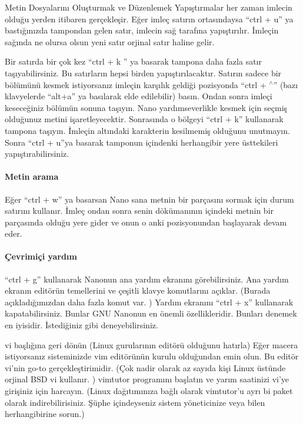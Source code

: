 \documentclass[10pt,a5paper]{book}
\begin{document}
\begin{section}{Metin Dosyalarını Oluşturmak ve Düzenlemek}
Yapıştırmalar her zaman imlecin olduğu yerden itibaren gerçekleşir. Eğer imleç satırın ortasındaysa “ctrl + u” ya bastığınızda tampondan gelen satır, imlecin sağ tarafına yapıştırılır. İmleçin sağında ne olursa olsun yeni satır orjinal satır haline gelir. 

Bir satırda bir çok kez “ctrl + k ” ya basarak tampona daha fazla satır taşıyabilirsiniz. Bu satırların hepsi birden yapıştırılacaktır.
Satırın sadece bir bölümünü kesmek istiyorsanız imleçin karşılık geldiği pozisyonda “ctrl + $ ^\wedge $” (bazı klavyelerde “alt+a” ya basılarak elde edilebilir) basın. Ondan sonra imleçi keseceğiniz bölümün sonuna taşıyın. Nano yardımseverlikle kesmek için seçmiş olduğunuz metini işaretleyecektir. Sonrasında o bölgeyi “ctrl + k” kullanarak tampona taşıyın. İmleçin altındaki karakterin kesilmemiş olduğunu unutmayın. Sonra “ctrl + u”ya basarak tamponun içindenki herhangibir yere üsttekileri yapıştırabilirsiniz. 

\paragraph{ Metin arama}{ Eğer “ctrl + w” ya basarsan Nano sana metnin bir parçasını sormak için durum satırını kullanır. İmleç ondan sonra senin dökümanının içindeki metnin bir parçasında olduğu yere gider ve onun o anki pozisyonundan başlayarak devam eder.}

\paragraph{ Çevrimiçi yardım}{ “ctrl + g” kullanarak Nanonun ana yardım ekranını görebilirsiniz. Ana yardım ekranın editörün temellerini ve çeşitli klavye komutlarını açıklar. (Burada açıkladığımızdan daha fazla komut var. ) Yardım ekranını “ctrl + x” kullanarak kapatabilirsiniz.
Bunlar GNU Nanonun en önemli özellikleridir. Bunları denemek en iyisidir. İstediğiniz gibi deneyebilirsiniz.}

vi başlığına geri dönün (Linux gurularının editörü olduğunu hatırla) Eğer macera istiyorsanız sisteminizde vim editörünün kurulu olduğundan emin olun. Bu editör vi’nin go-to gerçekleştirimidir. (Çok nadir olarak az sayıda kişi Linux üstünde orjinal BSD vi kullanır. ) vimtutor programını başlatın ve yarım saatinizi vi’ye girişiniz için harcayın. (Linux dağıtımınıza bağlı olarak vimtutor’u ayrı bi paket olarak indirebilirisiniz. Şüphe içindeyseniz sistem yöneticinize veya bilen herhangibirine sorun.)


\end{section}
\end{document}
